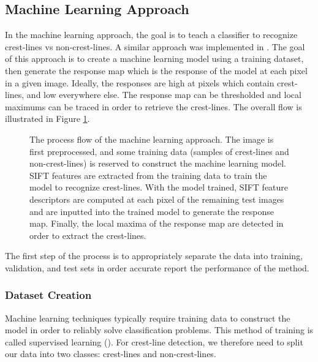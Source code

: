 \subsection{Machine Learning Approach} \label{subsec:machine_learning_approach}

In the machine learning approach, the goal is to teach a classifier to recognize crest-lines vs non-crest-lines. A similar approach was implemented in \cite{2006_automated_classification_landform_elements,2007_Machine_Learning_tools_automatic_mapping_mars,2013_sar_image_automated_detection_dune_area,BandeiraMarques,2011_neural_network_based_dunal_landform_mapping,vaz_object_based_dune_analysis}. The goal of this approach is to create a machine learning model using a training dataset, then generate the response map which is the response of the model at each pixel in a given image. Ideally, the responses are high at pixels which contain crest-lines, and low everywhere else. The response map can be thresholded and local maximums can be traced in order to retrieve the crest-lines. The overall flow is illustrated in Figure \ref{fig:flow_ml}.

\begin{figure}[H]
	\centering
	\caption{The process flow of the machine learning approach. The image is first preprocessed, and some training data (samples of crest-lines and non-crest-lines) is reserved to construct the machine learning model. SIFT features are extracted from the training data to train the model to recognize crest-lines. With the model trained, SIFT feature descriptors are computed at each pixel of the remaining test images and are inputted into the trained model to generate the response map. Finally, the local maxima of the response map are detected in order to extract the crest-lines. }
	\label{fig:flow_ml}
\end{figure}

The first step of the process is to appropriately separate the data into training, validation, and test sets in order accurate report the performance of the method. 

\subsubsection{Dataset Creation} \label{subsubsec:dataset_creation}

Machine learning techniques typically require training data to construct the model in order to reliably solve classification problems. This method of training is called supervised learning (\cite{foundations_machine_learning_book,machine_learning_book}). For crest-line detection, we therefore need to split our data into two classes: crest-lines and non-crest-lines. 


